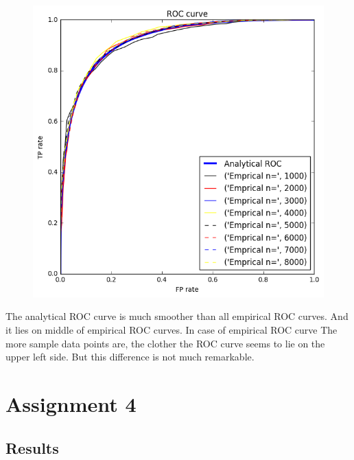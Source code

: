 \documentclass[a4paper,11pt]{article}
\begin{document}
\begin{verbatim}








\end{verbatim}

\begin{figure}[htbp]
  \includegraphics[scale=0.6]{rocall.png}
\end{figure}

The analytical ROC curve is much smoother than all empirical ROC curves. And it lies on middle of empirical ROC curves. In case of empirical ROC curve The more sample data points are, the clother the ROC curve seems to lie on the upper left side. But this difference is not much remarkable.

	


\section*{Assignment 4}
\subsection*{Results}
\end{document}
